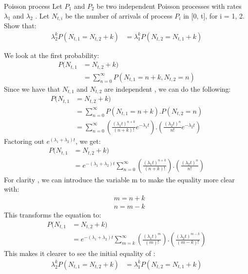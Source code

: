 \begin{problem}{Poisson process}
Let $P_1$ and $P_2$ be two independent Poisson processes with rates 
$\lambda_1$ and $\lambda_2$ . Let $N_{t,i}$ be the number of arrivals of process $P_i$ in [0, t], for i = 1, 2. Show that:
\begin{align*}
    \lambda_2^k P(N_{t,1} = N_{t,2} + k) 
    &=\lambda_1^k P(N _{t,2} = N_{t,1} + k)
\end{align*}
\end{problem}

\begin{solution}
We look at the first probability:
\begin{align*}
    P(N_{t,1}&= N_{t,2}+k)\\
    &= \sum_{n=0}^{\infty} P(N_{t,1}=n+k,N_{t,2}=n)
\end{align*}
Since we have that $N_{t,1}$ and $N_{t,2}$ are independent , we can do the following:
\begin{align*}
   P(N_{t,1}&=N_{t,2}+k)\\
   &= \sum_{n=0}^\infty P(N_{t,1}= n+k).P(N_{t,2}=n)
   \\&=\sum_{n=0}^\infty \left ( \frac{(\lambda_1 t)^{n+k}}{(n+k)!} e^{-\lambda_1 t} \right ). \left ( \frac{(\lambda_2 t)^n}{n!} e^{-\lambda_2 t}\right )
\end{align*}
Factoring out $e^{(\lambda_1+\lambda_2) t}$, we get:
\begin{align*}
     P(N_{t,1}&=N_{t,2}+k)\\
     &=e^{-(\lambda_1+\lambda_2) t}\sum_{n=0}^\infty \left ( \frac{(\lambda_1 t)^{n+k}}{(n+k)!}  \right ). \left ( \frac{(\lambda_2 t)^n}{n!} \right )
\end{align*}
For clarity , we can introduce the variable m to make the equality more clear with:
\begin{align*}
    &m=n+k\\
    &n=m-k
\end{align*}
This transforms the equation to:
\begin{align*}
       P(N_{t,1}&=N_{t,2}+k)\\
     &=e^{-(\lambda_1+\lambda_2) t}\sum_{m=k}^\infty \left ( \frac{(\lambda_1 t)^{m}}{(m)!}  \right ). \left ( \frac{(\lambda_2 t)^{m-k}}{(m-k)!} \right )
\end{align*}
This makes it clearer to see the initial equality of : 
\begin{align*}
    \lambda_2^k P(N_{t,1} = N_{t,2} + k) 
    &=\lambda_1^k P(N _{t,2} = N_{t,1} + k)
\end{align*}
\end{solution}

